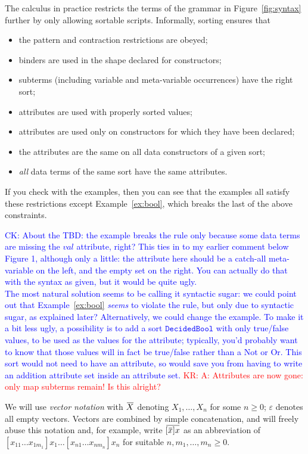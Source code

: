 \documentclass[letterpaper,11pt]{article}
\newcommand{\CK}[1]{\textcolor{blue}{CK: #1}}
\newcommand{\KR}[1]{\textcolor{red}{KR: #1}}
\begin{document}
The \hax calculus in practice restricts the terms of the grammar in Figure~\ref{fig:syntax} further
by only allowing sortable scripts. Informally, sorting ensures that
\begin{itemize}
\item the pattern and contraction restrictions are obeyed;
\item binders are used in the shape declared for constructors;
\item subterms (including variable and meta-variable occurrences) have the right sort;
\item attributes are used with properly sorted values;
\item attributes are used only on constructors for which they have been declared;
\item the attributes are the same on all data constructors of a given sort;
\item \emph{all} data terms of the same sort have the same attributes.
\end{itemize}
If you check with the examples, then you can see that the examples all satisfy these restrictions
except Example~\ref{ex:bool}, which breaks the last of the above constraints. 

\CK{About the TBD: the example breaks the rule only because some data terms are
missing the $\mathit{val}$ attribute, right?  This ties in to my earlier
comment below Figure 1, although only a little: the attribute here should be a
catch-all meta-variable on the left, and the empty set on the right.  You can
actually do that with the syntax as given, but it would be quite ugly. \\
The most natural solution seems to be calling it syntactic sugar: we could
point out that Example~\ref{ex:bool} \emph{seems} to violate the rule, but
only due to syntactic sugar, as explained later?  Alternatively, we could
change the example.  To make it a bit less ugly, a possibility is to add a
sort $\mathtt{DecidedBool}$ with only true/false values, to be used as the
values for the attribute; typically, you'd probably want to know that those
values will in fact be true/false rather than a Not or Or.  This sort would
not need to have an attribute, so would save you from having to write an
addition attribute set inside an attribute set.}
\KR{A: Attributes are now gone: only map subterms remain! Is this alright?}

\begin{notation}[vectors]
  We will use \emph{vector notation} with $\ov{X}$ denoting $X_1,…,X_n$ for some $n≥0$; $ε$ denotes
  all empty vectors. Vectors are combined by simple concatenation, and will freely abuse this
  notation and, for example, write $\ov{[\ov{x}]x}$ as an abbreviation of
  $[x_{11}…x_{1m_1}]x_1…[x_{n1}…x_{nm_n}]x_n$ for suitable $n,m_1,…,m_n ≥ 0$.
\end{notation}
\end{document}
